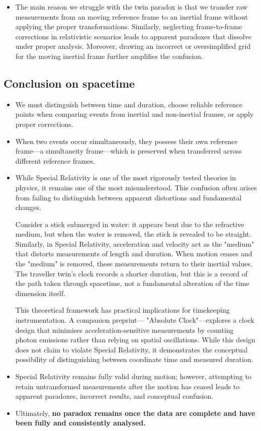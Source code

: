 \documentclass[a4paper,fleqn]{cas-sc}
\begin{document}
\begin{itemize}
 			\item The main reason we struggle with the twin paradox is that we transfer raw measurements from an moving reference frame to an inertial frame without applying the proper transformations. Similarly, neglecting frame-to-frame corrections in relativistic scenarios leads to apparent paradoxes that dissolve under proper analysis. Moreover, drawing an incorrect or oversimplified grid for the moving inertial frame further amplifies the confusion.
		\end{itemize}
	\subsection{Conclusion on spacetime}\label{subsec6_3}
		\begin{itemize}
			\item We must distinguish between time and duration, choose reliable reference points when comparing events from inertial and non-inertial frames, or apply proper corrections. 
			\item When two events occur simultaneously, they possess their own reference frame—a simultaneity frame—which is preserved when transferred across different reference frames.
			\item While Special Relativity is one of the most rigorously tested theories in physics, it remains one of the most misunderstood. This confusion often arises from failing to distinguish between apparent distortions and fundamental changes.

Consider a stick submerged in water: it appears bent due to the refractive medium, but when the water is removed, the stick is revealed to be straight. Similarly, in Special Relativity, acceleration and velocity act as the "medium" that distorts measurements of length and duration. When motion ceases and the "medium" is removed, these measurements return to their inertial values. The traveller twin's clock records a shorter duration, but this is a record of the path taken through spacetime, not a fundamental alteration of the time dimension itself.

	This theoretical framework has practical implications for timekeeping instrumentation. A companion preprint— "Absolute Clock"—explores a clock design that minimises acceleration-sensitive measurements by counting photon emissions rather than relying on spatial oscillations. While this design does not claim to violate Special Relativity, it demonstrates the conceptual possibility of distinguishing between coordinate time and measured duration.
	
			\item Special Relativity remains fully valid during motion; however, attempting to retain untransformed measurements after the motion has ceased leads to apparent paradoxes, incorrect results, and conceptual confusion. 
			
			\item Ultimately, \textbf{no paradox remains once the data are complete and have been fully and consistently analysed.}
		\end{itemize}

%





\end{document}
